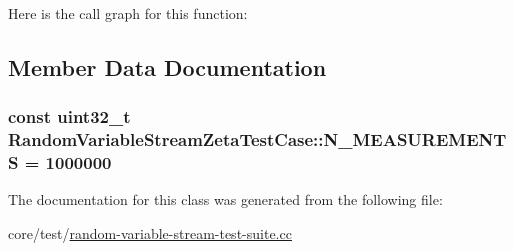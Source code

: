 Here is the call graph for this function\+:




\subsection{Member Data Documentation}
\subsubsection[{\texorpdfstring{N\+\_\+\+M\+E\+A\+S\+U\+R\+E\+M\+E\+N\+TS}{N_MEASUREMENTS}}]{\setlength{\rightskip}{0pt plus 5cm}const uint32\+\_\+t Random\+Variable\+Stream\+Zeta\+Test\+Case\+::\+N\+\_\+\+M\+E\+A\+S\+U\+R\+E\+M\+E\+N\+TS = 1000000\hspace{0.3cm}{\ttfamily [static]}}\hypertarget{classRandomVariableStreamZetaTestCase_a40f8e66ab80fb024916ce61573e37b41}{}\label{classRandomVariableStreamZetaTestCase_a40f8e66ab80fb024916ce61573e37b41}


The documentation for this class was generated from the following file\+:\begin{DoxyCompactItemize}
\item 
core/test/\hyperlink{random-variable-stream-test-suite_8cc}{random-\/variable-\/stream-\/test-\/suite.\+cc}\end{DoxyCompactItemize}
